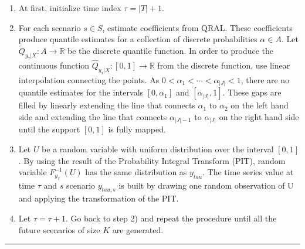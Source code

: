 \begin{enumerate}
	
	\item At first, initialize time index $\tau = |T| + 1$.
	
	\item For each scenario $s \in S$, estimate coefficients from QRAL. These coefficients produce quantile estimates for a collection of discrete probabilities $\alpha \in A$. Let $\tilde{Q}_{y_\tau|X}:A \rightarrow \mathbb{R}$ be the discrete quantile function. In order to produce the continuous function $\hat{Q}_{y_\tau|X}:[0,1] \rightarrow \mathbb{R}$ from the discrete function, use linear interpolation connecting the points. As $0 < \alpha_1 < \cdots < \alpha_{|J|} < 1$, there are no quantile estimates for the intervals $[0,\alpha_1]$ and $[\alpha_{|J|},1]$. These gaps are filled by linearly extending the line that connects $\alpha_1$ to $\alpha_2$ on the left hand side and extending the line that connects $\alpha_{|J|-1}$ to $\alpha_{|J|}$ on the right hand side until the support $[0,1]$ is fully mapped.  
	
	
	
	\item Let $U$ be a random variable with uniform distribution over the interval $[0,1]$. By using the result of the Probability Integral Transform (PIT), random variable $F^{-1}_{y_{\tau}}(U)$ has the same distribution as $y_{tau}$. The time series value at time $\tau$ and $s$ scenario $y_{tau,s}$ is built by drawing one random observation of U and applying the transformation of the PIT.

	\item Let $\tau = \tau + 1$. Go back to step 2) and repeat the procedure until all the future scenarios of size $K$ are generated. 


\end{enumerate}


\noindent\rule{\columnwidth}{1pt}
